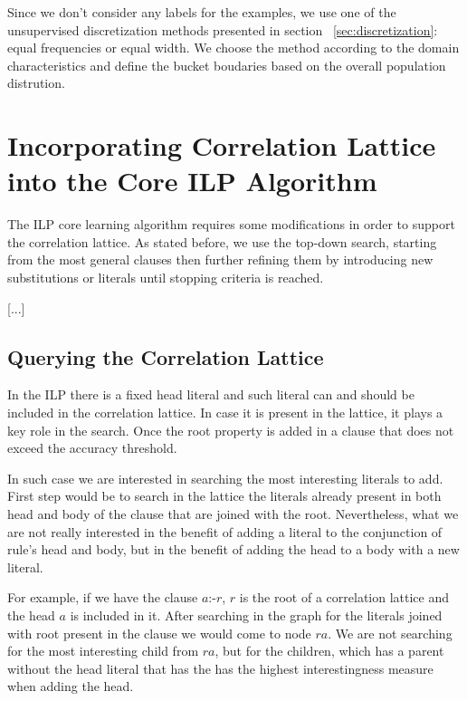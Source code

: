 Since we don't consider any labels for the examples, we use one of the unsupervised discretization methods presented
in
section ~\ref{sec:discretization}: equal frequencies or equal width. We choose the method according to the domain
characteristics and define the bucket boudaries based on the overall population distrution.

\section{Incorporating Correlation Lattice into the Core ILP Algorithm}

The ILP core learning algorithm requires some modifications in order to support the correlation lattice. As stated
before, we use the top-down search, starting from the most general clauses then further refining them by introducing
new
substitutions or literals until stopping criteria is reached.

[...]

\subsection{Querying the Correlation Lattice}

In the ILP there is a fixed head literal and such literal can and should be included in the correlation lattice. In
case
it is present in the lattice, it plays a key role in the search. Once the root property is added in a clause that does
not exceed the accuracy threshold.

In such case we are interested in searching the most interesting literals to add. First step would be to search in the
lattice the literals already present in both head and body of the clause that are joined with the root. Nevertheless,
what we are not really interested in the benefit of adding a literal to the conjunction of rule's head and body, but
in
the benefit of adding the head to a body with a new literal.

For example, if we have the clause $a$:-$r$, $r$ is the root of a correlation lattice and the head $a$ is included in
it. After searching in the graph for the literals joined with root present in the clause we would come to node
$ra$. We are not searching for the most interesting child from $ra$, but for the children, which has a parent without
the head literal that has the has the highest interestingness measure when adding the head.

